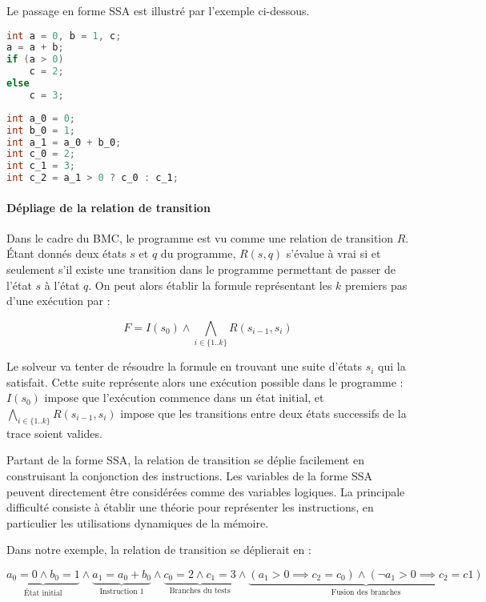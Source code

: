 Le passage en forme \ac{SSA} est illustré par l'exemple ci-dessous.

\noindent\begin{minipage}{.45\textwidth}
\begin{lstlisting}[language=C, caption=Code initial, frame=tlrb]
int a = 0, b = 1, c;
a = a + b;
if (a > 0)
    c = 2;
else
    c = 3;
\end{lstlisting}
\end{minipage}\hfill
\begin{minipage}{.45\textwidth}
\begin{lstlisting}[language=C, caption=Forme SSA,frame=tlrb]
int a_0 = 0;
int b_0 = 1;
int a_1 = a_0 + b_0;
int c_0 = 2;
int c_1 = 3;
int c_2 = a_1 > 0 ? c_0 : c_1;
\end{lstlisting}
\end{minipage}

\paragraph{Dépliage de la relation de transition}
Dans le cadre du \ac{BMC}, le programme est vu comme une relation de transition
\(R\). Étant donnés deux états \(s\) et \(q\) du programme, \(R(s, q)\) s'évalue
à vrai si et seulement s’il existe une transition dans le programme permettant
de passer de l'état \(s\) à l'état \(q\). On peut alors établir la formule
représentant les \(k\) premiers pas d'une exécution par :

\[
F = I(s_0) \land \bigwedge_{i\in \{1..k\}} R(s_{i-1}, s_i)
\]

Le solveur va tenter de résoudre la formule en trouvant une suite d'états
\(s_i\) qui la satisfait. Cette suite représente alors une exécution possible
dans le programme : \(I(s_0)\) impose que l'exécution commence dans un état
initial, et \(\bigwedge_{i\in \{1..k\}} R(s_{i-1}, s_i)\) impose que les
transitions entre deux états successifs de la trace soient valides.

Partant de la forme \ac{SSA}, la relation de transition se déplie facilement
en construisant la conjonction des instructions. Les variables de la forme \ac{SSA}
peuvent directement être considérées comme des variables logiques. La principale
difficulté consiste à établir une théorie pour représenter les
instructions, en particulier les utilisations dynamiques de la mémoire.

Dans notre exemple, la relation de transition se déplierait en :

\[
  \underbrace{a_0 = 0 \land b_0 = 1}_\text{État initial} \land
  \underbrace{a_1 = a_0 + b_0}_\text{Instruction 1} \land
  \underbrace{c_0 = 2 \land c_1 = 3}_\text{Branches du tests} \land
  \underbrace{(a_1 > 0 \implies c_2 = c_0)
    \land (\lnot a_1 > 0 \implies c_2 = c1)
  }_\text{Fusion des branches}
\]


